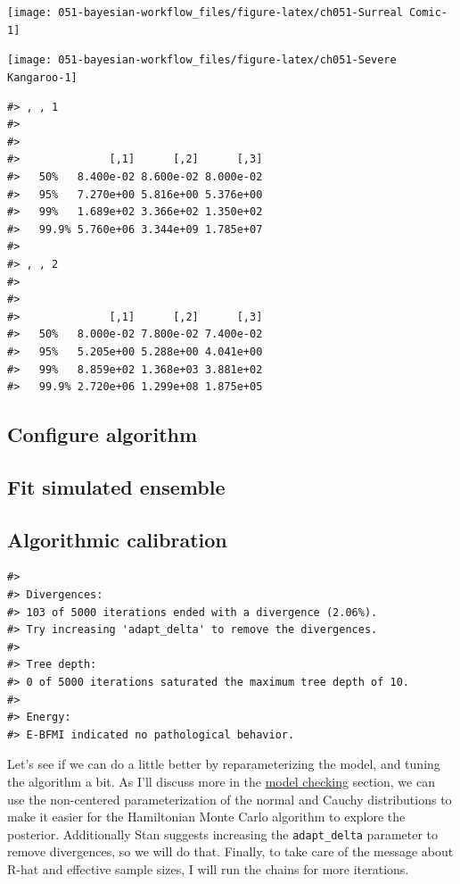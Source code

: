 \documentclass[11pt, oneside, openany]{scrbook}
\begin{document}
\begin{center}\texttt{[image: 051-bayesian-workflow\_files/figure-latex/ch051-Surreal Comic-1]} \end{center}

\begin{center}\texttt{[image: 051-bayesian-workflow\_files/figure-latex/ch051-Severe Kangaroo-1]} \end{center}

\begin{verbatim}
#> , , 1
#> 
#>        
#>              [,1]      [,2]      [,3]
#>   50%   8.400e-02 8.600e-02 8.000e-02
#>   95%   7.270e+00 5.816e+00 5.376e+00
#>   99%   1.689e+02 3.366e+02 1.350e+02
#>   99.9% 5.760e+06 3.344e+09 1.785e+07
#> 
#> , , 2
#> 
#>        
#>              [,1]      [,2]      [,3]
#>   50%   8.000e-02 7.800e-02 7.400e-02
#>   95%   5.205e+00 5.288e+00 4.041e+00
#>   99%   8.859e+02 1.368e+03 3.881e+02
#>   99.9% 2.720e+06 1.299e+08 1.875e+05
\end{verbatim}

\hypertarget{configure-algorithm}{%
\subsection{Configure algorithm}\label{configure-algorithm}}

\hypertarget{fit-simulated-ensemble}{%
\subsection{Fit simulated ensemble}\label{fit-simulated-ensemble}}

\hypertarget{algorithmic-calibration}{%
\subsection{Algorithmic calibration}\label{algorithmic-calibration}}

\begin{verbatim}
#> 
#> Divergences:
#> 103 of 5000 iterations ended with a divergence (2.06%).
#> Try increasing 'adapt_delta' to remove the divergences.
#> 
#> Tree depth:
#> 0 of 5000 iterations saturated the maximum tree depth of 10.
#> 
#> Energy:
#> E-BFMI indicated no pathological behavior.
\end{verbatim}

Let's see if we can do a little better by reparameterizing the model, and tuning the algorithm a bit. As I'll discuss more in the \protect\hyperlink{model-checking}{model checking} section, we can use the non-centered parameterization of the normal and Cauchy distributions to make it easier for the Hamiltonian Monte Carlo algorithm to explore the posterior. Additionally Stan suggests increasing the \texttt{adapt\_delta} parameter to remove divergences, so we will do that. Finally, to take care of the message about R-hat and effective sample sizes, I will run the chains for more iterations.
\end{document}

